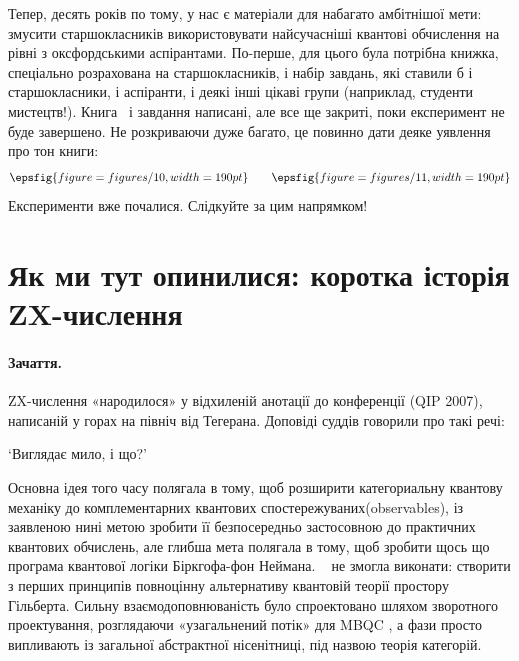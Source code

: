 \documentclass[11pt]{article}
\theoremstyle{definition}
\begin{document}
{Тепер, десять років по тому, у нас є матеріали для набагато амбітнішої мети: змусити старшокласників використовувати найсучасніші квантові обчислення на рівні з оксфордськими аспірантами. По-перше, для цього була потрібна книжка, спеціально розрахована на старшокласників, і набір завдань, які ставили б і старшокласники, і аспіранти, і деякі інші цікаві групи (наприклад, студенти мистецтв!). Книга~\cite{CoeckeGogioso2018} і завдання написані, але все ще закриті, поки експеримент не буде завершено. Не розкриваючи дуже багато, це повинно дати деяке уявлення про тон книги:
\[
\epsfig{figure=figures/10,width=190pt}
\qquad
\epsfig{figure=figures/11,width=190pt}
\]
Експерименти вже почалися. Слідкуйте за цим напрямком!

\section{Як ми тут опинилися: коротка історія ZX-числення}\label{sec:furtherrefs}%

\paragraph{Зачаття.} ZX-числення «народилося» у відхиленій анотації до конференції \cite{CD0} (QIP 2007), написаній у горах на північ від Тегерана. Доповіді суддів говорили про такі речі:
\begin{center}
`Виглядає мило, і що?'
\end{center}

Основна ідея того часу полягала в тому, щоб розширити категориальну квантову механіку до комплементарних квантових спостережуваних(observables), із заявленою нині метою зробити її безпосередньо застосовною до практичних квантових обчислень, але глибша мета полягала в тому, щоб зробити щось що програма квантової логіки Біркгофа-фон Неймана. ~\cite{BvN} не змогла виконати:
створити з перших принципів повноцінну альтернативу квантовій теорії простору Гільберта. Сильну взаємодоповнюваність було спроектовано шляхом зворотного проектування, розглядаючи «узагальнений потік» для MBQC \cite{DP2}, а фази просто випливають із загальної абстрактної нісенітниці, під назвою теорія категорій.

  
}
\end{document}
